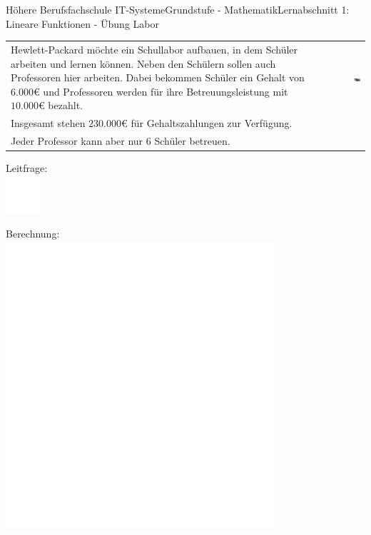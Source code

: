 \documentclass[oneside,openany,headings=optiontotoc,11pt,numbers=noenddot]{scrreprt}
\begin{document}
\begin{worksheet}{Höhere Berufsfachschule IT-Systeme}{Grundstufe - Mathematik}{Lernabschnitt 1: Lineare Funktionen - Übung}
		\setcounter{page}{1}
		\noindent
		\LARGE Labor\\
		\normalsize
		\noindent
		\begin{tabularx}{\textwidth}{Xr}
			\noindent
			Hewlett-Packard möchte ein Schullabor aufbauen, in dem Schüler arbeiten und lernen können. Neben den Schülern sollen auch Professoren hier arbeiten. Dabei bekommen Schüler ein Gehalt von \(6.000\)\euro{} und Professoren werden für ihre Betreuungsleistung mit \(10.000\)\euro{} bezahlt.& \includegraphics[width=0.15\textwidth,align=b]{../99_Bilder/comp.jpg}\\
			Insgesamt stehen \(230.000\)\euro{} für Gehaltszahlungen zur Verfügung.\\
			Jeder Professor kann aber nur 6 Schüler betreuen.\\			
		\end{tabularx}
		\begin{framed}
			\noindent
			\small{\color{codegray}Leitfrage:}\\
			\includegraphics[width=0.1\textwidth]{../../empty.jpg}\\
		\end{framed}
		\begin{framed}
			\noindent
			\small{\color{codegray}Berechnung:}\\
			\includegraphics[width=0.75\textwidth]{../../empty.jpg}

\end{framed}
\end{worksheet}
\end{document}
